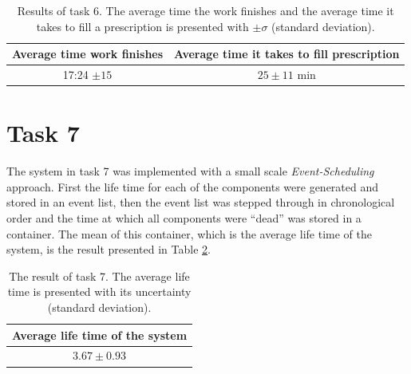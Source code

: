 \documentclass[]{article}
\begin{document}
\begin{table}[H]
  \centering
  \caption{Results of task 6. The average time the work finishes and the average time it takes to fill a prescription is presented with $\pm \sigma$ (standard deviation).}
  \begin{tabular}{c | c}
    Average time work finishes & Average time it takes to fill prescription \\ \hline
    17:24 $\pm 15$ & $25 \pm 11$ min
  \end{tabular}
  \label{tab:task6}
\end{table}

\section{Task 7}
The system in task 7 was implemented with a small scale {\it Event-Scheduling} approach.
First the life time for each of the components were generated and stored in an event list, then the event list was stepped through in chronological order and the time at which all components were ``dead'' was stored in a container.
The mean of this container, which is the average life time of the system, is the result presented in Table \ref{tab:task7}.
\begin{table}[H]
  \centering
  \caption{The result of task 7. The average life time is presented with its uncertainty (standard deviation).}
  \begin{tabular}{c}
    Average life time of the system \\ \hline
    $3.67 \pm 0.93$
  \end{tabular}
  \label{tab:task7}
\end{table}


 
\end{document}
